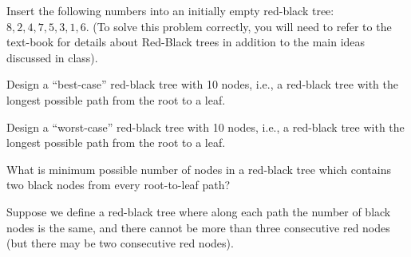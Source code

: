 \documentclass[addpoints,12pt]{exam}
\begin{document}
\begin{questions}

\question
Insert the following numbers into an initially empty red-black tree: $8, 2, 4, 7, 5, 3, 1, 6$. 
(To solve this problem correctly, you will need to refer to the text-book for details about Red-Black trees in 
addition to the main ideas discussed in class).

\question
Design a ``best-case'' red-black tree with 10 nodes, i.e., a red-black tree with the longest 
possible path from the root to a leaf.

\question
Design a ``worst-case'' red-black tree with 10 nodes, i.e., a red-black tree with the longest 
possible path from the root to a leaf.

\question
What is minimum possible number of nodes in a red-black tree which contains two black nodes 
from every root-to-leaf path? 

\question
Suppose we define a red-black tree where along each path the number of black nodes is the 
same, and there cannot be more than three consecutive red nodes (but there may be two 
consecutive red nodes).

\end{questions}
\end{document}

